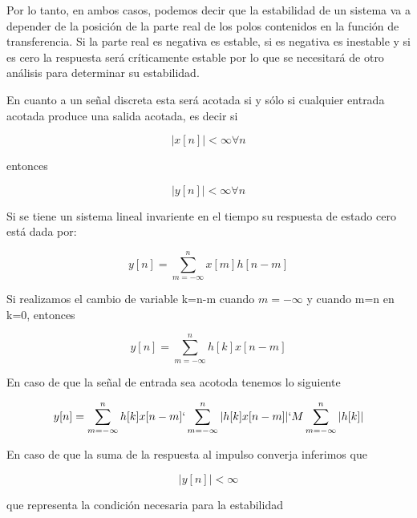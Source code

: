 Por lo tanto, en ambos casos, podemos decir que la estabilidad de un sistema va a depender de la posición de la parte real de los polos contenidos en la función de transferencia. Si la parte real es negativa es estable, si es negativa es inestable y si es cero la respuesta será críticamente estable por lo que se necesitará de otro análisis para determinar su estabilidad.

En cuanto a un señal discreta esta será acotada si y sólo si cualquier entrada acotada produce una salida acotada, es decir si

\begin{equation}
|x[n]|<\infty \forall n
\end{equation}

entonces 

\begin{equation}
|y[n]|<\infty \forall n
\end{equation}

Si se tiene un sistema lineal invariente en el tiempo su respuesta de estado cero está dada por:

\begin{equation}
y[n]=\sum_{m=-\infty}^n x[m]h[n-m]
\end{equation}

Si realizamos el cambio de variable k=n-m cuando $m=-\infty$ y cuando m=n en k=0, entonces

\begin{equation}
y[n]=\sum_{m=-\infty}^n h[k]x[n-m]
\end{equation}

En caso de que la señal de entrada sea acotoda tenemos lo siguiente

\begin{equation}
y[n]=\sum_{m=-\infty}^n h[k]x[n-m] \lq \sum_{m=-\infty}^n |h[k]x[n-m]| \lq M\sum_{m=-\infty}^n |h[k]|
\end{equation}

En caso de que la suma de la respuesta al impulso converja inferimos que 

\begin{equation}
|y[n]|<\infty
\end{equation}

que representa la condición necesaria para la estabilidad